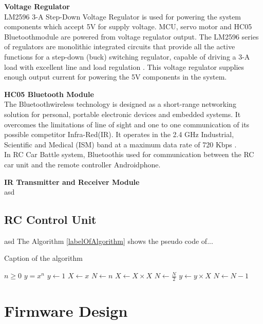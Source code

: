 \noindent \textbf{Voltage Regulator} \\
LM2596 3-A Step-Down Voltage Regulator is used for powering the system components which accept 5V for supply voltage. MCU, servo motor and HC05 Bluetooth\texttrademark\;module are powered from voltage regulator output. The LM2596 series of regulators are monolithic
integrated circuits that provide all the active functions for a step-down (buck) switching regulator, capable of driving a 3-A load with excellent line and load
regulation \cite{Three}. This voltage regulator supplies enough output current for powering the 5V components in the system.

\noindent \textbf{HC05 Bluetooth Module} \\
The Bluetooth\texttrademark\;wireless technology is designed as a short-range networking solution for personal, portable electronic devices and embedded systems. It overcomes the limitations of line of sight and one to one communication of its possible competitor Infra-Red(IR). It operates in the 2.4 GHz Industrial, Scientific and Medical (ISM) band at a maximum data rate of 720 Kbps \cite{Bluetooth_Overview}. \\

In RC Car Battle system, Bluetooth\texttrademark\;is used for communication between the RC car unit and the remote controller Android\texttrademark\;phone. 

\noindent \textbf{IR Transmitter and Receiver Module} \\
asd


\subsection{RC Control Unit}
asd
The Algorithm \ref{labelOfAlgorithm} shows the pseudo code of...
\begin{algorithm}
\caption{Caption of the algorithm}
\label{labelOfAlgorithm}
\begin{algorithmic}
\Require $n \geq 0$ %
\Ensure $y = x^n$  %
\State $y \gets 1$
\State $X \gets x$
\State $N \gets n$
    \State $X \gets X \times X$
    \State $N \gets \frac{N}{2}$  
    \State $y \gets y \times X$
    \State $N \gets N - 1$
\EndIf
\EndWhile
\end{algorithmic}
\end{algorithm}

\section{Firmware Design} \label{sec_firmware_design}

